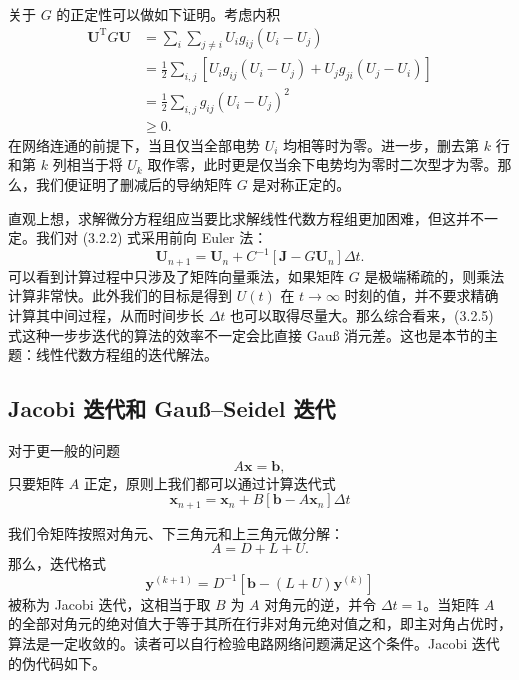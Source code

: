 关于 $G$ 的正定性可以做如下证明。考虑内积
\begin{equation}
\begin{aligned}
\bm U^{\mathrm T}G\bm U
&=\sum_i\sum_{j\ne i}U_i g_{ij}(U_i-U_j)\\
&=\frac12\sum_{i,j}\left[U_i g_{ij}(U_i-U_j)+U_j g_{ji}(U_j-U_i)\right]\\
&=\frac12\sum_{i,j}g_{ij}(U_i-U_j)^2\\
&\ge0.
\end{aligned}
\tag{3.2.4}
\end{equation}
在网络连通的前提下，当且仅当全部电势 $U_i$ 均相等时为零。进一步，删去第 $k$ 行和第 $k$ 列相当于将 $U_k$ 取作零，此时更是仅当余下电势均为零时二次型才为零。那么，我们便证明了删减后的导纳矩阵 $G$ 是对称正定的。

直观上想，求解微分方程组应当要比求解线性代数方程组更加困难，但这并不一定。我们对 (3.2.2) 式采用前向 Euler 法：
\begin{equation}
\bm U_{n+1}=\bm U_n+C^{-1}[\bm J-G\bm U_n]\Delta t.
\tag{3.2.5}
\end{equation}
可以看到计算过程中只涉及了矩阵向量乘法，如果矩阵 $G$ 是极端稀疏的，则乘法计算非常快。此外我们的目标是得到 $U(t)$ 在 $t\to\infty$ 时刻的值，并不要求精确计算其中间过程，从而时间步长 $\Delta t$ 也可以取得尽量大。那么综合看来，(3.2.5) 式这种一步步迭代的算法的效率不一定会比直接 Gauß 消元差。这也是本节的主题：线性代数方程组的迭代解法。

\subsection{Jacobi 迭代和 Gauß--Seidel 迭代}

对于更一般的问题
\begin{equation}
A\bm x=\bm b,
\tag{3.2.6}
\end{equation}
只要矩阵 $A$ 正定，原则上我们都可以通过计算迭代式
\begin{equation}
\bm x_{n+1}=\bm x_n+B[\bm b-A\bm x_n]\Delta t
\tag{3.2.7}
\end{equation}



我们令矩阵按照对角元、下三角元和上三角元做分解：
\begin{equation}
A=D+L+U.
\tag{3.2.8}
\end{equation}
那么，迭代格式
\begin{equation}
\bm y^{(k+1)}=D^{-1}\left[\bm b-(L+U)\bm y^{(k)}\right]
\tag{3.2.9}
\end{equation}
被称为 Jacobi 迭代，这相当于取 $B$ 为 $A$ 对角元的逆，并令 $\Delta t=1$。当矩阵 $A$ 的全部对角元的绝对值大于等于其所在行非对角元绝对值之和，即主对角占优时，算法是一定收敛的。读者可以自行检验电路网络问题满足这个条件。Jacobi 迭代的伪代码如下。

